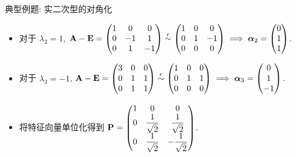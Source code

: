 \begin{frame}{典型例题: 实二次型的对角化}
	\onslide<+->
	\begin{solutionc}
		\begin{itemize}
			\item 对于 $\lambda_2=1$, ${\mathbf{A}}-{\mathbf{E}}=\begin{pmatrix}
				1&0&0\\
				0&-1&1\\
				0&1&-1
			\end{pmatrix}\mathrel{\overset{r}{\sim}}\begin{pmatrix}
				1&0&0\\
				0&1&-1\\
				0&0&0
			\end{pmatrix}\implies{\boldsymbol{\alpha}}_2=\begin{pmatrix}
				0\\1\\1
			\end{pmatrix}$.
			\item 对于 $\lambda_3=-1$, ${\mathbf{A}}-{\mathbf{E}}=\begin{pmatrix}
				3&0&0\\
				0&1&1\\
				0&1&1
			\end{pmatrix}\mathrel{\overset{r}{\sim}}\begin{pmatrix}
				1&0&0\\
				0&1&1\\
				0&0&0
			\end{pmatrix}\implies{\boldsymbol{\alpha}}_3=\begin{pmatrix}
				0\\1\\-1
			\end{pmatrix}$.
			\item 将特征向量单位化得到 ${\mathbf{P}}=\begin{pmatrix}
				1&0&0\\
				0&\dfrac1{\sqrt2}&\dfrac1{\sqrt2}\\
				0&\dfrac1{\sqrt2}&-\dfrac1{\sqrt2}
			\end{pmatrix}$.
		\end{itemize}
	\end{solutionc}
\end{frame}


